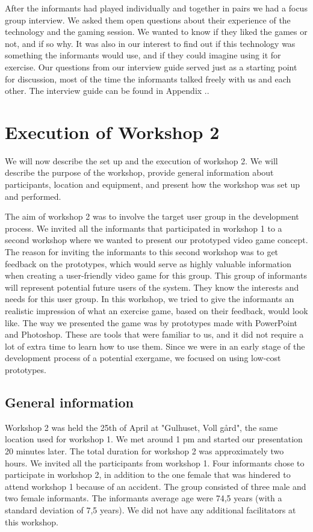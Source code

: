 After the informants had played individually and together in pairs we had a focus group interview. We asked them open questions about their experience of the technology and the gaming session. We wanted to know if they liked the games or not, and if so why. It was also in our interest to find out if this technology was something the informants would use, and if they could imagine using it for exercise. Our questions from our interview guide served just as a starting point for discussion, most of the time the informants talked freely with us and each other. The interview guide can be found in Appendix ..                 


\section{Execution of Workshop 2}
\label{sec:ws2}
We will now describe the set up and the execution of workshop 2. We will describe the purpose of the workshop, provide general information about participants, location and equipment, and present how the workshop was set up and performed. 

The aim of workshop 2 was to involve the target user group in the development process. We invited all the informants that participated in workshop 1 to a second workshop where we wanted to present our prototyped video game concept. The reason for inviting the informants to this second workshop was to get feedback on the prototypes, which would serve as highly valuable information when creating a user-friendly video game for this group. This group of informants will represent potential future users of the system. They know the interests and needs for this user group. In this workshop, we tried to give the informants an realistic impression of what an exercise game, based on their feedback, would look like. The way we presented the game was by prototypes made with PowerPoint and Photoshop. These are tools that were familiar to us, and it did not require a lot of extra time to learn how to use them. Since we were in an early stage of the development process of a potential exergame, we focused on using low-cost prototypes.  

\subsection{General information}
Workshop 2 was held the 25th of April at "Gulhuset, Voll gård", the same location used for workshop 1. We met around 1 pm and started our presentation 20 minutes later. The total duration for workshop 2 was approximately two hours. We invited all the participants from workshop 1. Four informants chose to participate in workshop 2, in addition to the one female that was hindered to attend workshop 1 because of an accident. The group consisted of three male and two female informants. The informants average age were 74,5 years (with a standard deviation of 7,5 years). We did not have any additional facilitators at this workshop. 

